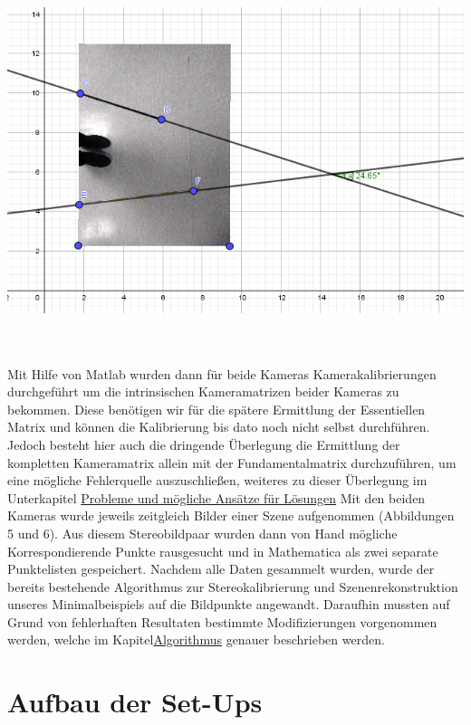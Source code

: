 \begin{minipage}{\linewidth}
	\centering
	\includegraphics[width=1.\linewidth]{images/WinkelAbschaetzung.png}
\end{minipage}\\\\	

Mit Hilfe von Matlab wurden dann für beide Kameras Kamerakalibrierungen durchgeführt um die intrinsischen Kameramatrizen beider Kameras zu bekommen. Diese benötigen wir für die spätere Ermittlung der Essentiellen Matrix und können die Kalibrierung bis dato noch nicht selbst durchführen. Jedoch besteht hier auch die dringende Überlegung die Ermittlung der kompletten Kameramatrix allein mit der Fundamentalmatrix durchzuführen, um eine mögliche Fehlerquelle auszuschließen, weiteres zu dieser Überlegung im Unterkapitel \hyperref[sec:problem]{Probleme und mögliche Ansätze für Lösungen}  Mit den beiden Kameras wurde jeweils zeitgleich Bilder einer Szene aufgenommen (Abbildungen 5 und 6). Aus diesem Stereobildpaar wurden dann von Hand mögliche Korrespondierende Punkte rausgesucht und in Mathematica als zwei separate Punktelisten gespeichert. Nachdem alle Daten gesammelt wurden, wurde der bereits bestehende Algorithmus zur Stereokalibrierung und Szenenrekonstruktion unseres Minimalbeispiels auf die Bildpunkte angewandt. Daraufhin mussten auf Grund von fehlerhaften Resultaten bestimmte Modifizierungen vorgenommen werden, welche im Kapitel\hyperref[sec:alg]{Algorithmus} genauer beschrieben werden.
\section{Aufbau der Set-Ups}

